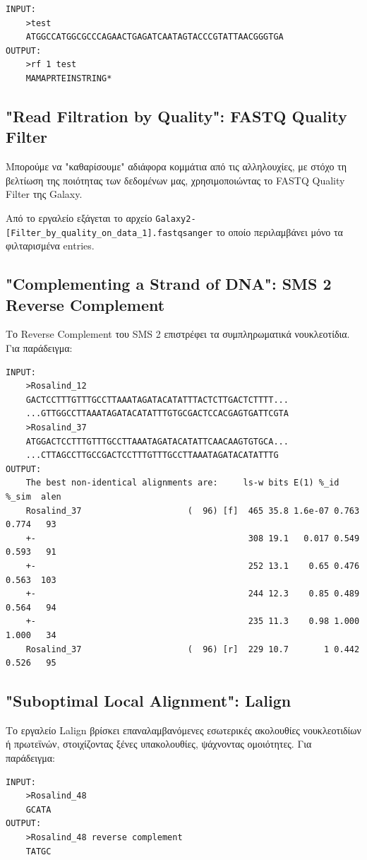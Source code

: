 \begin{graycomment} \footnotesize
    \begin{verbatim}
INPUT:
    >test
    ATGGCCATGGCGCCCAGAACTGAGATCAATAGTACCCGTATTAACGGGTGA
OUTPUT:
    >rf 1 test
    MAMAPRTEINSTRING*
\end{verbatim}
\end{graycomment}

    \subsection{"Read Filtration by Quality": FASTQ Quality Filter}
        Μπορούμε να "καθαρίσουμε" αδιάφορα κομμάτια από τις αλληλουχίες, με στόχο τη βελτίωση της ποιότητας των δεδομένων μας, χρησιμοποιώντας το FASTQ Quality Filter της Galaxy. \cite{GalaxyFastQQualityFliter}

        Από το εργαλείο εξάγεται το αρχείο \verb|Galaxy2-[Filter_by_quality_on_data_1].fastqsanger| το οποίο περιλαμβάνει μόνο τα φιλταρισμένα entries.

    \subsection{"Complementing a Strand of DNA": SMS 2 Reverse Complement }
        Το Reverse Complement του SMS 2 επιστρέφει τα συμπληρωματικά νουκλεοτίδια. Για παράδειγμα:
\begin{graycomment} \footnotesize
    \begin{verbatim}
INPUT:
    >Rosalind_12
    GACTCCTTTGTTTGCCTTAAATAGATACATATTTACTCTTGACTCTTTT...
    ...GTTGGCCTTAAATAGATACATATTTGTGCGACTCCACGAGTGATTCGTA
    >Rosalind_37
    ATGGACTCCTTTGTTTGCCTTAAATAGATACATATTCAACAAGTGTGCA...
    ...CTTAGCCTTGCCGACTCCTTTGTTTGCCTTAAATAGATACATATTTG
OUTPUT:
    The best non-identical alignments are:     ls-w bits E(1) %_id  %_sim  alen
    Rosalind_37                     (  96) [f]  465 35.8 1.6e-07 0.763 0.774   93
    +-                                          308 19.1   0.017 0.549 0.593   91
    +-                                          252 13.1    0.65 0.476 0.563  103
    +-                                          244 12.3    0.85 0.489 0.564   94
    +-                                          235 11.3    0.98 1.000 1.000   34
    Rosalind_37                     (  96) [r]  229 10.7       1 0.442 0.526   95\end{verbatim}
\end{graycomment}

    \subsection{"Suboptimal Local Alignment": Lalign}
        Το εργαλείο Lalign \cite{Lalign} βρίσκει επαναλαμβανόμενες εσωτερικές ακολουθίες νουκλεοτιδίων ή πρωτεϊνών, στοιχίζοντας ξένες υπακολουθίες, ψάχνοντας ομοιότητες. Για παράδειγμα:
\begin{graycomment} \footnotesize
    \begin{verbatim}
INPUT:
    >Rosalind_48
    GCATA
OUTPUT:
    >Rosalind_48 reverse complement
    TATGC\end{verbatim}
\end{graycomment}



